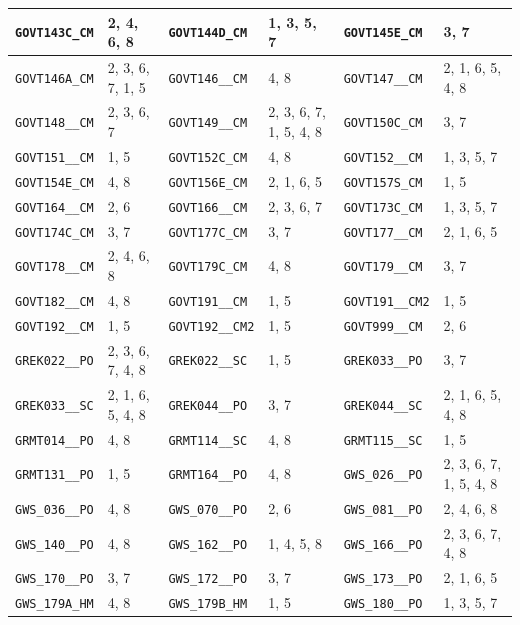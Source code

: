 \begin{longtable}{|l|l||l|l||l|l|}
    \verb|GOVT143C_CM| & 2, 4, 6, 8 & \verb|GOVT144D_CM| & 1, 3, 5, 7 & \verb|GOVT145E_CM| & 3, 7\\\hline
    \verb|GOVT146A_CM| & 2, 3, 6, 7, 1, 5 & \verb|GOVT146__CM| & 4, 8 & \verb|GOVT147__CM| & 2, 1, 6, 5, 4, 8\\\hline
    \verb|GOVT148__CM| & 2, 3, 6, 7 & \verb|GOVT149__CM| & 2, 3, 6, 7, 1, 5, 4, 8 & \verb|GOVT150C_CM| & 3, 7\\\hline
    \verb|GOVT151__CM| & 1, 5 & \verb|GOVT152C_CM| & 4, 8 & \verb|GOVT152__CM| & 1, 3, 5, 7\\\hline
    \verb|GOVT154E_CM| & 4, 8 & \verb|GOVT156E_CM| & 2, 1, 6, 5 & \verb|GOVT157S_CM| & 1, 5\\\hline
    \verb|GOVT164__CM| & 2, 6 & \verb|GOVT166__CM| & 2, 3, 6, 7 & \verb|GOVT173C_CM| & 1, 3, 5, 7\\\hline
    \verb|GOVT174C_CM| & 3, 7 & \verb|GOVT177C_CM| & 3, 7 & \verb|GOVT177__CM| & 2, 1, 6, 5\\\hline
    \verb|GOVT178__CM| & 2, 4, 6, 8 & \verb|GOVT179C_CM| & 4, 8 & \verb|GOVT179__CM| & 3, 7\\\hline
    \verb|GOVT182__CM| & 4, 8 & \verb|GOVT191__CM| & 1, 5 & \verb|GOVT191__CM2| & 1, 5\\\hline
    \verb|GOVT192__CM| & 1, 5 & \verb|GOVT192__CM2| & 1, 5 & \verb|GOVT999__CM| & 2, 6\\\hline
    \verb|GREK022__PO| & 2, 3, 6, 7, 4, 8 & \verb|GREK022__SC| & 1, 5 & \verb|GREK033__PO| & 3, 7\\\hline
    \verb|GREK033__SC| & 2, 1, 6, 5, 4, 8 & \verb|GREK044__PO| & 3, 7 & \verb|GREK044__SC| & 2, 1, 6, 5, 4, 8\\\hline
    \verb|GRMT014__PO| & 4, 8 & \verb|GRMT114__SC| & 4, 8 & \verb|GRMT115__SC| & 1, 5\\\hline
    \verb|GRMT131__PO| & 1, 5 & \verb|GRMT164__PO| & 4, 8 & \verb|GWS_026__PO| & 2, 3, 6, 7, 1, 5, 4, 8\\\hline
    \verb|GWS_036__PO| & 4, 8 & \verb|GWS_070__PO| & 2, 6 & \verb|GWS_081__PO| & 2, 4, 6, 8\\\hline
    \verb|GWS_140__PO| & 4, 8 & \verb|GWS_162__PO| & 1, 4, 5, 8 & \verb|GWS_166__PO| & 2, 3, 6, 7, 4, 8\\\hline
    \verb|GWS_170__PO| & 3, 7 & \verb|GWS_172__PO| & 3, 7 & \verb|GWS_173__PO| & 2, 1, 6, 5\\\hline
    \verb|GWS_179A_HM| & 4, 8 & \verb|GWS_179B_HM| & 1, 5 & \verb|GWS_180__PO| & 1, 3, 5, 7\\\hline

\end{longtable}
